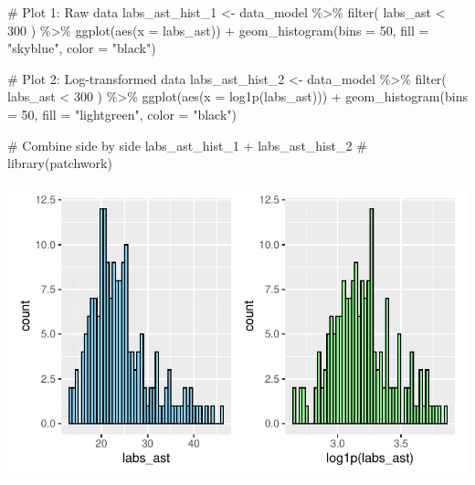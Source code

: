 \documentclass[
  letterpaper,
  DIV=11,
  numbers=noendperiod]{scrartcl}
\newenvironment{Shaded}{\begin{snugshade}}{\end{snugshade}}
\newcommand{\AttributeTok}[1]{\textcolor[rgb]{0.40,0.45,0.13}{#1}}
\newcommand{\CommentTok}[1]{\textcolor[rgb]{0.37,0.37,0.37}{#1}}
\newcommand{\DecValTok}[1]{\textcolor[rgb]{0.68,0.00,0.00}{#1}}
\newcommand{\FunctionTok}[1]{\textcolor[rgb]{0.28,0.35,0.67}{#1}}
\newcommand{\NormalTok}[1]{\textcolor[rgb]{0.00,0.23,0.31}{#1}}
\newcommand{\OtherTok}[1]{\textcolor[rgb]{0.00,0.23,0.31}{#1}}
\newcommand{\SpecialCharTok}[1]{\textcolor[rgb]{0.37,0.37,0.37}{#1}}
\newcommand{\StringTok}[1]{\textcolor[rgb]{0.13,0.47,0.30}{#1}}
\begin{document}
\begin{Shaded}
\begin{Highlighting}[]
\CommentTok{\# Plot 1: Raw data}
\NormalTok{labs\_ast\_hist\_1 }\OtherTok{\textless{}{-}}\NormalTok{ data\_model }\SpecialCharTok{\%\textgreater{}\%} 
    \FunctionTok{filter}\NormalTok{(}
\NormalTok{        labs\_ast }\SpecialCharTok{\textless{}} \DecValTok{300}
\NormalTok{    ) }\SpecialCharTok{\%\textgreater{}\%} 
    \FunctionTok{ggplot}\NormalTok{(}\FunctionTok{aes}\NormalTok{(}\AttributeTok{x =}\NormalTok{ labs\_ast)) }\SpecialCharTok{+} 
    \FunctionTok{geom\_histogram}\NormalTok{(}\AttributeTok{bins =} \DecValTok{50}\NormalTok{, }\AttributeTok{fill =} \StringTok{"skyblue"}\NormalTok{, }\AttributeTok{color =} \StringTok{"black"}\NormalTok{)}

\CommentTok{\# Plot 2: Log{-}transformed data}
\NormalTok{labs\_ast\_hist\_2 }\OtherTok{\textless{}{-}}\NormalTok{ data\_model }\SpecialCharTok{\%\textgreater{}\%} 
    \FunctionTok{filter}\NormalTok{(}
\NormalTok{        labs\_ast }\SpecialCharTok{\textless{}} \DecValTok{300}
\NormalTok{    ) }\SpecialCharTok{\%\textgreater{}\%}
    \FunctionTok{ggplot}\NormalTok{(}\FunctionTok{aes}\NormalTok{(}\AttributeTok{x =} \FunctionTok{log1p}\NormalTok{(labs\_ast))) }\SpecialCharTok{+} 
    \FunctionTok{geom\_histogram}\NormalTok{(}\AttributeTok{bins =} \DecValTok{50}\NormalTok{, }\AttributeTok{fill =} \StringTok{"lightgreen"}\NormalTok{, }\AttributeTok{color =} \StringTok{"black"}\NormalTok{)}

\CommentTok{\# Combine side by side}
\NormalTok{labs\_ast\_hist\_1 }\SpecialCharTok{+}\NormalTok{ labs\_ast\_hist\_2 }\CommentTok{\# library(patchwork)}
\end{Highlighting}
\end{Shaded}

\includegraphics{Outcomes_V1V2V3_files/figure-pdf/labs_ast_1-1.pdf}
\end{document}
